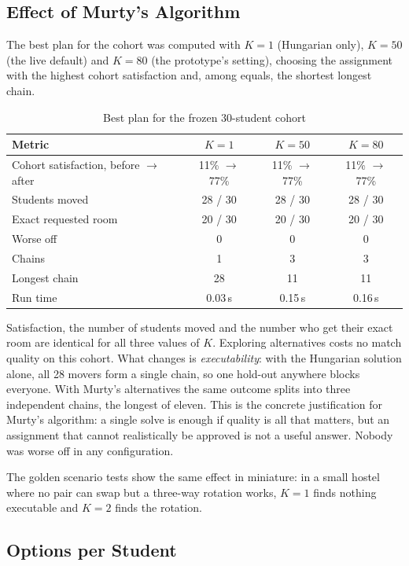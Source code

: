 \subsection{Effect of Murty's Algorithm}

The best plan for the cohort was computed with $K = 1$ (Hungarian only),
$K = 50$ (the live default) and $K = 80$ (the prototype's setting),
choosing the assignment with the highest cohort satisfaction and, among
equals, the shortest longest chain.

\begin{table}[H]
\centering
\begin{tabular}{lccc}
\toprule
\textbf{Metric} & $K=1$ & $K=50$ & $K=80$ \\
\midrule
Cohort satisfaction, before $\to$ after & 11\% $\to$ 77\% & 11\% $\to$ 77\% & 11\% $\to$ 77\% \\
Students moved & 28 / 30 & 28 / 30 & 28 / 30 \\
Exact requested room & 20 / 30 & 20 / 30 & 20 / 30 \\
Worse off & 0 & 0 & 0 \\
Chains & 1 & 3 & 3 \\
Longest chain & 28 & 11 & 11 \\
Run time & 0.03\,s & 0.15\,s & 0.16\,s \\
\bottomrule
\end{tabular}
\caption{Best plan for the frozen 30-student cohort}
\label{tab:demo-k}
\end{table}

Satisfaction, the number of students moved and the number who get their
exact room are identical for all three values of $K$. Exploring
alternatives costs no match quality on this cohort. What changes is
\emph{executability}: with the Hungarian solution alone, all 28 movers
form a single chain, so one hold-out anywhere blocks everyone. With
Murty's alternatives the same outcome splits into three independent
chains, the longest of eleven. This is the concrete justification for
Murty's algorithm: a single solve is enough if quality is all that
matters, but an assignment that cannot realistically be approved is not
a useful answer. Nobody was worse off in any configuration.

The golden scenario tests show the same effect in miniature: in a small
hostel where no pair can swap but a three-way rotation works, $K = 1$
finds nothing executable and $K = 2$ finds the rotation.

\subsection{Options per Student}

